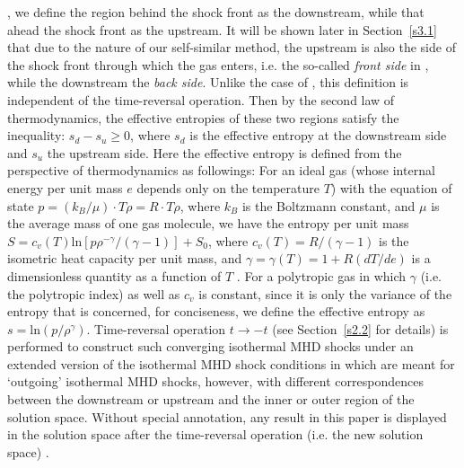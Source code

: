 \documentclass[fleqn,usenatbib]{mnras}
\begin{document}
, we define the region behind the shock front as the downstream, while that ahead the shock front as the upstream. It will be shown later in Section~\ref{s3.1} that due to the nature of our self-similar method, the upstream is also the side of the shock front through which the gas enters, i.e. the so-called \textit{front side} in \citet{SFSW}, while the downstream the \textit{back side}. Unlike the case of \citet{lou2014self}, this definition is independent of the time-reversal operation. Then by the second law of thermodynamics, the effective entropies of these two regions satisfy the inequality: $s_{d}-s_{u}\geq 0$, where $s_{d}$ is the effective entropy at the downstream side and $s_{u}$ the upstream side. Here the effective entropy is defined from the perspective of thermodynamics as followings: For an ideal gas (whose internal energy per unit mass $e$ depends only on the temperature $T$) with the equation of state $p=\left(k_{B}/\mu\right)\cdot T\rho=R\cdot T\rho$, where $k_{B}$ is the Boltzmann constant, and $\mu$ is the average mass of one gas molecule, we have the entropy per unit mass $S=c_{v}(T)\mathrm{ln}\left[ p\rho^{-\gamma}/\left(\gamma-1\right)\right]+S_{0}$, where $c_{v}(T)=R/\left(\gamma-1\right)$ is the isometric heat capacity per unit mass, and $\gamma=\gamma(T)=1+R\left(dT/de\right)$ is a dimensionless quantity as a function of $T$ \citep{SFSW}. For a polytropic gas in which $\gamma$ (i.e. the polytropic index) as well as $c_{v}$ is constant, since it is only the variance of the entropy that is concerned, for conciseness, we define the effective entropy as $s=\mathrm{ln}\left(p/\rho^{\gamma}\right)$. Time-reversal operation $t\rightarrow -t$ (see Section~\ref{s2.2} for details) is performed to construct such converging isothermal MHD shocks under an extended version of the isothermal MHD shock conditions in \citet{yuLou2006} which are meant for `outgoing' isothermal MHD shocks, however, with different correspondences between the downstream or upstream and the inner or outer region of the solution space. Without special annotation, any result in this paper is displayed in the solution space after the time-reversal operation (i.e. the new solution space)
.
\end{document}
